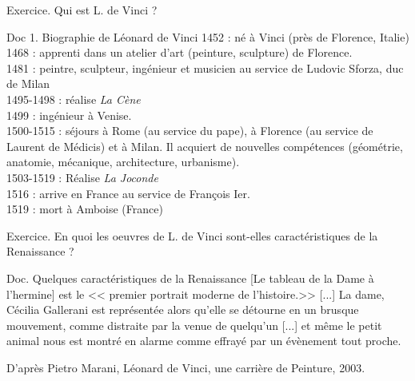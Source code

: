 \documentclass{beamer}
\begin{document}
\begin{frame}{Exercice. Qui est L. de Vinci ?}
\begin{beamerboxesrounded}[scheme=blocimage]{Doc 1. Biographie de Léonard de Vinci}
1452 : né à Vinci (près de Florence, Italie) \\
1468 : apprenti dans un atelier d'art (peinture, sculpture) de Florence. \\
1481 : peintre, sculpteur, ingénieur et musicien au service de Ludovic Sforza, duc de Milan \\
1495-1498 : réalise \textit{La Cène} \\
1499 : ingénieur à Venise. \\
1500-1515 : séjours à Rome (au service du pape), à Florence (au service de Laurent de Médicis) et à Milan. Il acquiert de nouvelles compétences (géométrie, anatomie, mécanique, architecture, urbanisme). \\
1503-1519 : Réalise \textit{La Joconde} \\
1516 : arrive en France au service de François Ier.  \\
1519 : mort à Amboise (France)
\end{beamerboxesrounded}
\end{frame}

\begin{frame}{Exercice. En quoi les oeuvres de L. de Vinci sont-elles caractéristiques de la Renaissance ? }
\begin{beamerboxesrounded}[scheme=blocimage]{Doc. Quelques caractéristiques de la Renaissance}
[Le tableau de la Dame à l'hermine] est le << premier portrait moderne de l'histoire.>> [...] La dame, Cécilia Gallerani est représentée alors qu'elle se détourne en un brusque mouvement, comme distraite par la venue de quelqu'un [...] et même le petit animal nous est montré en alarme comme effrayé par un évènement tout proche.
\begin{flushright}
D'après Pietro Marani, Léonard de Vinci, une carrière de Peinture, 2003. \\
\end{flushright}
\end{beamerboxesrounded}
\end{frame}
\end{document}
